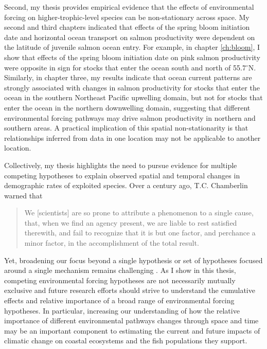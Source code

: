 Second, my thesis provides empirical evidence that the effects of environmental
forcing on higher-trophic-level species can be non-stationary across space. My
second and third chapters indicated that effects of the spring bloom initiation
date and horizontal ocean transport on salmon productivity were dependent on the
latitude of juvenile salmon ocean entry. For example, in chapter \ref{ch:bloom},
I show that effects of the spring bloom initiation date on pink salmon
productivity were opposite in sign for stocks that enter the ocean south and
north of 55.7$^{\circ}$N. Similarly, in chapter three, my results indicate that
ocean current patterns are strongly associated with changes in salmon
productivity for stocks that enter the ocean in the southern Northeast Pacific
upwelling domain, but not for stocks that enter the ocean in the northern
downwelling domain, suggesting that different environmental forcing pathways may
drive salmon productivity in northern and southern areas. A practical
implication of this spatial non-stationarity is that relationships inferred from
data in one location may not be applicable to another location.

Collectively, my thesis highlights the need to pursue evidence for multiple
competing hypotheses to explain observed spatial and temporal changes in
demographic rates of exploited species. Over a century ago, T.C. Chamberlin
warned that
\begin{quote}
  We [scientists] are so prone to attribute a phenomenon to a single
  cause, that, when we find an agency present, we are liable to rest satisfied
  therewith, and fail to recognize that it is but one factor, and perchance a
  minor factor, in the accomplishment of the total result.
  \citep[p. 94]{Chamberlin1890}
\end{quote}
Yet, broadening our focus beyond a single hypothesis or set of hypotheses
focused around a single mechanism remains challenging \citep{Hare2014}. As I
show in this thesis, competing environmental forcing hypotheses are not
necessarily mutually exclusive and future research efforts should strive to
understand the cumulative effects and relative importance of a broad range of
environmental forcing hypotheses. In particular, increasing our understanding of
how the relative importance of different environmental pathways changes through
space and time may be an important component to estimating the current and
future impacts of climatic change on coastal ecosystems and the fish populations
they support.

